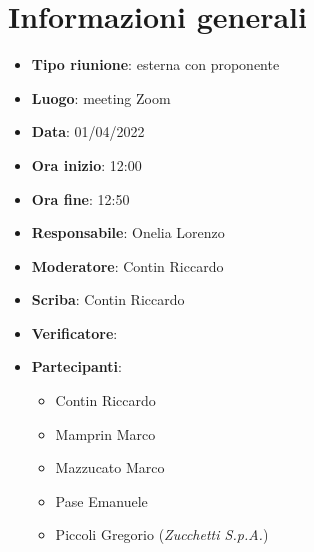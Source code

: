 \section{Informazioni generali}
\begin{itemize}
  \item \textbf{Tipo riunione}: esterna con proponente
  \item \textbf{Luogo}: meeting Zoom
  \item \textbf{Data}: 01/04/2022
  \item \textbf{Ora inizio}: 12:00
  \item \textbf{Ora fine}: 12:50
  \item \textbf{Responsabile}: Onelia Lorenzo
  \item \textbf{Moderatore}: Contin Riccardo
  \item \textbf{Scriba}: Contin Riccardo
  \item \textbf{Verificatore}: 
  \item \textbf{Partecipanti}:
  \begin{itemize}
    \item Contin Riccardo
    \item Mamprin Marco
    \item Mazzucato Marco
    \item Pase Emanuele
    \item Piccoli Gregorio (\textit{Zucchetti S.p.A.})
  \end{itemize}
\end{itemize}
